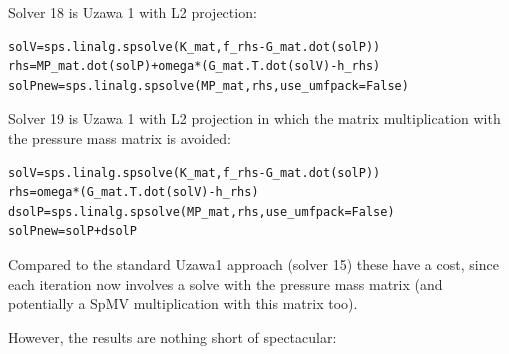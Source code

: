 Solver 18 is Uzawa 1 with L2 projection:
\begin{lstlisting}
solV=sps.linalg.spsolve(K_mat,f_rhs-G_mat.dot(solP))     
rhs=MP_mat.dot(solP)+omega*(G_mat.T.dot(solV)-h_rhs)      
solPnew=sps.linalg.spsolve(MP_mat,rhs,use_umfpack=False)   
\end{lstlisting}


Solver 19 is Uzawa 1 with L2 projection in which 
the matrix multiplication with the pressure mass matrix is avoided:
\begin{lstlisting}
solV=sps.linalg.spsolve(K_mat,f_rhs-G_mat.dot(solP))   
rhs=omega*(G_mat.T.dot(solV)-h_rhs)                     
dsolP=sps.linalg.spsolve(MP_mat,rhs,use_umfpack=False)   
solPnew=solP+dsolP                                    
\end{lstlisting}

Compared to the standard Uzawa1 approach (solver 15) these have a cost, 
since each iteration now involves a solve with the pressure mass matrix 
(and potentially a SpMV multiplication with this matrix too). 

However, the results are nothing short of spectacular:

